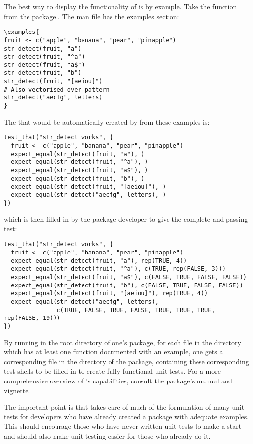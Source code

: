 The best way to display the functionality of  is by example. Take the  function from the  package \citep{stringr}. The man file  has the examples section:
\begin{verbatim}
\examples{
fruit <- c("apple", "banana", "pear", "pinapple")
str_detect(fruit, "a")
str_detect(fruit, "^a")
str_detect(fruit, "a$")
str_detect(fruit, "b")
str_detect(fruit, "[aeiou]")
# Also vectorised over pattern
str_detect("aecfg", letters)
}
\end{verbatim}
The  that would be automatically created by  from these examples is:
\begin{verbatim}
test_that("str_detect works", {
  fruit <- c("apple", "banana", "pear", "pinapple")
  expect_equal(str_detect(fruit, "a"), )
  expect_equal(str_detect(fruit, "^a"), )
  expect_equal(str_detect(fruit, "a$"), )
  expect_equal(str_detect(fruit, "b"), )
  expect_equal(str_detect(fruit, "[aeiou]"), )
  expect_equal(str_detect("aecfg", letters), )
})
\end{verbatim}
which is then filled in by the package developer to give the complete and passing test:
\begin{verbatim}
test_that("str_detect works", {
  fruit <- c("apple", "banana", "pear", "pinapple")
  expect_equal(str_detect(fruit, "a"), rep(TRUE, 4))
  expect_equal(str_detect(fruit, "^a"), c(TRUE, rep(FALSE, 3)))
  expect_equal(str_detect(fruit, "a$"), c(FALSE, TRUE, FALSE, FALSE))
  expect_equal(str_detect(fruit, "b"), c(FALSE, TRUE, FALSE, FALSE))
  expect_equal(str_detect(fruit, "[aeiou]"), rep(TRUE, 4))
  expect_equal(str_detect("aecfg", letters), 
               c(TRUE, FALSE, TRUE, FALSE, TRUE, TRUE, TRUE, rep(FALSE, 19)))
})
\end{verbatim}
By running  in the root directory of one's package, for each  file in the  directory which has at least one function documented with an example, one gets a corresponding file  in the  directory of the package, containing these corresponding test shells to be filled in to create fully functional unit tests.
For a more comprehensive overview of 's capabilities, consult the package's manual and vignette. 

The important point is that  takes care of much of the formulation of many unit tests for developers who have already created a package with adequate examples. This should encourage those who have never written unit tests to make a start and should also make unit testing easier for those who already do it.

